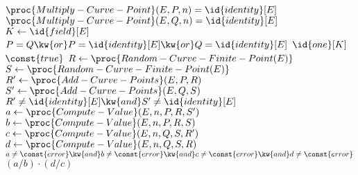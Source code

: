 \begin{algorithm}
\begin{codebox}
\li \Assert $\proc{Multiply-Curve-Point}(E, P, n) = \id{identity}[E]$
\li \Assert $\proc{Multiply-Curve-Point}(E, Q, n) = \id{identity}[E]$
\li $K \gets \id{field}[E]$
\li \If $P = Q \kw{ or } P = \id{identity}[E] \kw{ or } Q = \id{identity}[E]$
\li     \Then
            \Return $\id{one}[K]$
        \End
\li \While $\const{true}$
\li     \Do
            $R \gets \proc{Random-Curve-Finite-Point(E)}$
\li         $S \gets \proc{Random-Curve-Finite-Point(E)}$
\li         $R' \gets \proc{Add-Curve-Points}(E, P, R)$
\li         $S' \gets \proc{Add-Curve-Points}(E, Q, S)$
\li         \If $R' \neq \id{identity}[E] \kw{ and } S' \neq \id{identity}[E]$
\li             \Then
                    $a \gets \proc{Compute-Value}(E, n, P, R, S')$
\li                 $b \gets \proc{Compute-Value}(E, n, P, R, S)$
\li                 $c \gets \proc{Compute-Value}(E, n, Q, S, R')$
\li                 $d \gets \proc{Compute-Value}(E, n, Q, S, R)$
\li                 \If $a \neq \const{error} \kw{ and } b \neq \const{error} \kw{ and } c \neq \const{error} \kw{ and } d \neq \const{error}$
\li                     \Then
                            \Return $(a / b)\cdot(d / c)$
                        \End
                \End
        \End
\end{codebox}
\end{algorithm}

